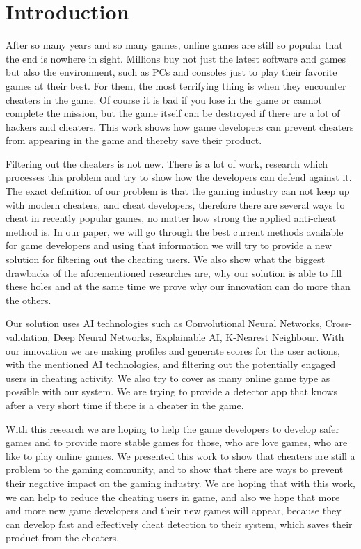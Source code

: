\section{Introduction}
\label{ch:intro}

After so many years and so many games, online games are still so popular that the end is nowhere in sight.
Millions buy not just the latest software and games but also the environment, such as PCs and consoles just to play their favorite games at their best.
For them, the most terrifying thing is when they encounter cheaters in the game.
Of course it is bad if you lose in the game or cannot complete the mission, but the game itself can be destroyed if there are a lot of hackers and cheaters.
This work shows how game developers can prevent cheaters from appearing in the game and thereby save their product.

Filtering out the cheaters is not new. 
There is a lot of work, research which processes this problem and try to show how the developers can defend against it.
The exact definition of our problem is that the gaming industry can not keep up with modern cheaters, and cheat developers, therefore there are several ways to cheat in recently popular games, no matter how strong the applied anti-cheat method is. 
In our paper, we will go through the best current methods available for game developers and using that information we will try to provide a new solution for filtering out the cheating users.
We also show what the biggest drawbacks of the aforementioned researches are, why our solution is able to fill these holes and at the same time we prove why our innovation can do more than the others.

Our solution uses AI technologies such as Convolutional Neural Networks, Cross-validation, Deep Neural Networks, Explainable AI, K-Nearest Neighbour.
With our innovation we are making profiles and generate scores for the user actions, with the mentioned AI technologies, and filtering out the potentially engaged users in cheating activity. 
We also try to cover as many online game type as possible with our system. We are trying to provide a detector app that knows after a very short time if there is a cheater in the game.

With this research we are hoping to help the game developers to develop safer games and to provide more stable games for those, who are love games, who are like to play online games.
We presented this work to show that cheaters are still a problem to the gaming community, and to show that there are ways to prevent their negative impact on the gaming industry.
We are hoping that with this work, we can help to reduce the cheating users in game, and also we hope that more and more new game developers and their new games will appear, because they can develop fast and effectively cheat detection to their system, which saves their product from the cheaters.

